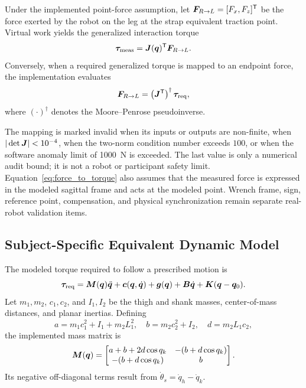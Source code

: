 Under the implemented point-force assumption, let
$\bm{F}_{R\rightarrow L}=[F_x,F_z]^{\mathsf T}$ be the force exerted by the
robot on the leg at the strap equivalent traction point.  Virtual work yields
the generalized interaction torque
\begin{equation}
    \bm{\tau}_{\mathrm{meas}}
    =\bm{J}(\bm{q})^{\mathsf T}\bm{F}_{R\rightarrow L}.
    \label{eq:force_to_torque}
\end{equation}
Conversely, when a required generalized torque is mapped to an endpoint force,
the implementation evaluates
\begin{equation}
    \bm{F}_{R\rightarrow L}
    =\left(\bm{J}^{\mathsf T}\right)^{\dagger}\bm{\tau}_{\mathrm{req}},
    \label{eq:torque_to_force}
\end{equation}
where $(\cdot)^{\dagger}$ denotes the Moore--Penrose pseudoinverse.

The mapping is marked invalid when its inputs or outputs are non-finite, when
$|\det\bm{J}|<10^{-4}$, when the two-norm condition number exceeds $100$, or
when the software anomaly limit of \SI{1000}{N} is exceeded.  The last value is
only a numerical audit bound; it is not a robot or participant safety limit.
Equation~\eqref{eq:force_to_torque} also assumes that the measured force is
expressed in the modeled sagittal frame and acts at the modeled point.  Wrench
frame, sign, reference point, compensation, and physical synchronization remain
separate real-robot validation items.

\subsection{Subject-Specific Equivalent Dynamic Model}
\label{subsec:dynamics}

The modeled torque required to follow a prescribed motion is
\begin{equation}
    \bm{\tau}_{\mathrm{req}}
    =\bm{M}(\bm{q})\ddot{\bm{q}}
    +\bm{c}(\bm{q},\dot{\bm{q}})
    +\bm{g}(\bm{q})
    +\bm{B}\dot{\bm{q}}
    +\bm{K}(\bm{q}-\bm{q}_0).
    \label{eq:inverse_dynamics}
\end{equation}
Let $m_1,m_2$, $c_1,c_2$, and $I_1,I_2$ be the thigh and shank masses,
center-of-mass distances, and planar inertias.  Defining
\begin{equation}
    a=m_1c_1^2+I_1+m_2L_1^2,\quad
    b=m_2c_2^2+I_2,\quad
    d=m_2L_1c_2,
    \label{eq:dynamic_abbreviations}
\end{equation}
the implemented mass matrix is
\begin{equation}
    \bm{M}(\bm{q})=
    \begin{bmatrix}
      a+b+2d\cos q_k & -(b+d\cos q_k)\\
      -(b+d\cos q_k) & b
    \end{bmatrix}.
    \label{eq:mass_matrix}
\end{equation}
Its negative off-diagonal terms result from
$\dot{\theta}_s=\dot q_h-\dot q_k$.

